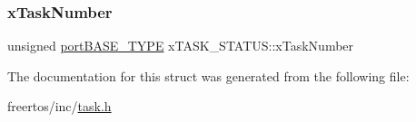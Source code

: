 \mbox{\label{structx_t_a_s_k___s_t_a_t_u_s_a14a06c8bd78b7f60f9395593ac06b286}} 
\subsubsection{\texorpdfstring{x\+Task\+Number}{xTaskNumber}}
{\footnotesize\ttfamily unsigned \mbox{\hyperlink{portmacro_8h_a1ebe82d24d764ae4e352f7c3a9f92c01}{port\+B\+A\+S\+E\+\_\+\+T\+Y\+PE}} x\+T\+A\+S\+K\+\_\+\+S\+T\+A\+T\+U\+S\+::x\+Task\+Number}



The documentation for this struct was generated from the following file\+:\begin{DoxyCompactItemize}
\item 
freertos/inc/\mbox{\hyperlink{task_8h}{task.\+h}}\end{DoxyCompactItemize}
